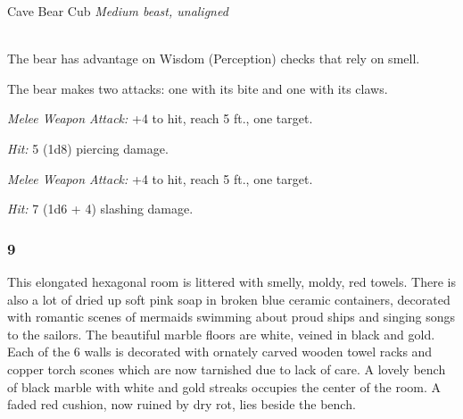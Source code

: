 \documentclass[palace_of_the_silver_princess]{subfiles}
\begin{document}
\begin{monsterbox}{Cave Bear Cub}
    \textit{Medium beast, unaligned}\\
    \hline
    \basics[%
        armorclass = 11,
        hitpoints  = 15,
        speed      = {40 ft., swim 30 ft.}
    ]
    \hline
    \stats[
        STR = \stat{10},
        DEX = \stat{5},
        CON = \stat{8},
        INT = \stat{1},
        WIS = \stat{6},
        CHA = \stat{3}
    ]
    \hline
    \details[
        skills = {Perception +3},
        senses = {darkvision 60 ft., passive Perception 13},
        languages = {---},
        challenge = {1 (200 XP)},
    ]
    \hline
    \\[1mm]
    \begin{monsteraction}
        The bear has advantage on Wisdom (Perception) checks
        that rely on smell.
    \end{monsteraction}
    \begin{monsteraction}[Multiattack]
        The bear makes two attacks: one with its bite
        and one with its claws.
    \end{monsteraction}

    \begin{monsteraction}[Bite]
        \textit{Melee Weapon Attack:} +4 to hit, reach 5 ft., one
        target.

        \textit{Hit:} 5 (1d8) piercing damage.
    \end{monsteraction}
    
    \begin{monsteraction}[Claws]
        \textit{Melee Weapon Attack:} +4 to hit, reach 5 ft., one
        target.

        \textit{Hit:} 7 (1d6 + 4) slashing damage.
    \end{monsteraction}
\end{monsterbox}

\subsubsection{9}
\begin{quotebox}
    This elongated hexagonal room is littered with smelly, moldy, red
    towels. There is also a lot of dried up soft pink soap in broken
    blue ceramic containers, decorated with romantic scenes of mermaids
    swimming about proud ships and singing songs to the sailors. The
    beautiful marble floors are white, veined in black and gold. Each of
    the 6 walls is decorated with ornately carved wooden towel racks and
    copper torch scones which are now tarnished due to lack of care. A
    lovely bench of black marble with white and gold streaks occupies
    the center of the room. A faded red cushion, now ruined by dry rot,
    lies beside the bench.
\end{quotebox}
\end{document}
